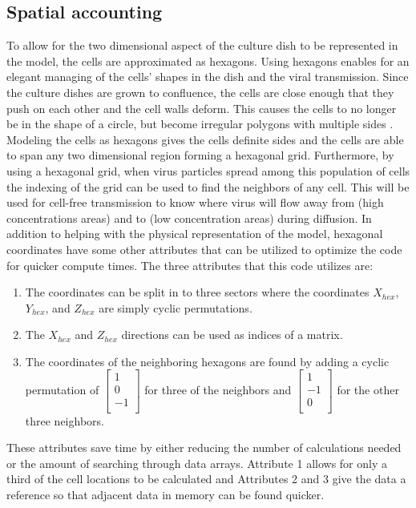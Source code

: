 
\subsection{Spatial accounting} \label{Spatial_accounting}

To allow for the two dimensional aspect of the culture dish to be represented in the model, the cells are approximated as hexagons. Using hexagons enables for an elegant managing of the cells' shapes in the dish and the viral transmission. Since the culture dishes are grown to confluence, the cells are close enough that they push on each other and the cell walls deform. This causes the cells to no longer be in the shape of a circle, but become irregular polygons with multiple sides \citep{bruckner_importance_2018}. Modeling the cells as hexagons gives the cells definite sides and the cells are able to span any two dimensional region forming a hexagonal grid. Furthermore, by using a hexagonal grid, when virus particles spread among this population of cells the indexing of the grid can be used to find the neighbors of any cell. This will be used for cell-free transmission to know where virus will flow away from (high concentrations areas) and to (low concentration areas) during diffusion. In addition to helping with the physical representation of the model, hexagonal coordinates have some other attributes that can be utilized to optimize the code for quicker compute times. The three attributes that this code utilizes are:
\begin{enumerate} 
    \item The coordinates can be split in to three sectors where the coordinates $X_{hex}$, $Y_{hex}$, and $Z_{hex}$ are simply cyclic permutations.
    \item The $X_{hex}$ and $Z_{hex}$ directions can be used as indices of a matrix.
    \item The coordinates of the neighboring hexagons are found by adding a cyclic permutation of 
        $\left [
            \begin{array}{c}
                1 \\
                0 \\
                -1\\
            \end{array}
        \right ]$
        for three of the neighbors and
        $\left [ 
            \begin{array}{c}
                1 \\
                -1 \\
                0\\
            \end{array}
        \right ]$
        for the other three neighbors.
\end{enumerate}
These attributes save time by either reducing the number of calculations needed or the amount of searching through data arrays. Attribute 1 allows for only a third of the cell locations to be calculated and Attributes 2 and 3 give the data a reference so that adjacent data in memory can be found quicker.

